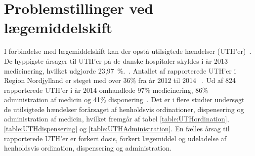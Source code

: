 \section{Problemstillinger ved lægemiddelskift}
I forbindelse med lægemiddelskift kan der opstå utilsigtede hændelser (UTH'er)~\citep{Amgros2015}. De hyppigste årsager til UTH'er på de danske hospitaler skyldes i år 2013 medicinering, hvilket udgjorde 23,97~\%.~\citep{Patientombuddet2013}. Antallet af rapporterede UTH'er i Region Nordjylland er steget med over 36\% fra år 2012 til 2014 ~\citep{Jensen2014}. Ud af 824 rapporterede UTH'er i år 2014 omhandlede 97\% medicinering, 86\% administration af medicin og 41\% disponering~\citep{Jensen2014}. Det er i flere studier undersøgt de utilsigtede hændelser forårsaget af henholdsvis ordinationer, dispensering og administration af medicin, hvilket fremgår af tabel \ref{table:UTHordination}, \ref{table:UTHdispensering} og \ref{table:UTHAdministration}. En fælles årsag til rapporterede UTH'er er forkert dosis, forkert lægemiddel og udeladelse af henholdsvis ordination, dispensering og administration.

